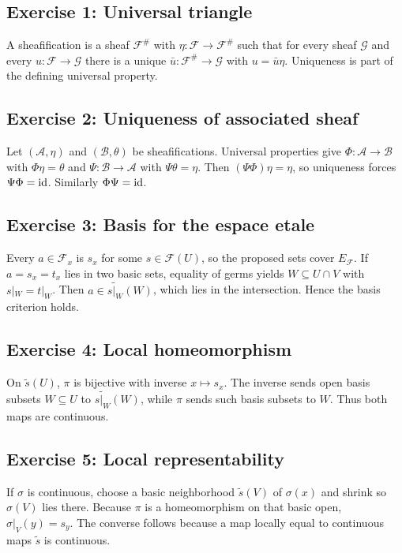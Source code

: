 \subsection*{Exercise 1: Universal triangle}
\begin{solution}
A sheafification is a sheaf $\mathcal F^\#$ with $\eta:\mathcal F\to\mathcal F^\#$ such that for every sheaf $\mathcal G$ and every $u:\mathcal F\to\mathcal G$ there is a unique $\bar u:\mathcal F^\#\to\mathcal G$ with $u=\bar u\eta$.  Uniqueness is part of the defining universal property.
\end{solution}

\subsection*{Exercise 2: Uniqueness of associated sheaf}
\begin{solution}
Let $(\mathcal A,\eta)$ and $(\mathcal B,\theta)$ be sheafifications.  Universal properties give $\Phi:\mathcal A\to\mathcal B$ with $\Phi\eta=\theta$ and $\Psi:\mathcal B\to\mathcal A$ with $\Psi\theta=\eta$.  Then $(\Psi\Phi)\eta=\eta$, so uniqueness forces $\Psi\Phi=\operatorname{id}$.  Similarly $\Phi\Psi=\operatorname{id}$.
\end{solution}

\subsection*{Exercise 3: Basis for the espace etale}
\begin{solution}
Every $a\in\mathcal F_x$ is $s_x$ for some $s\in\mathcal F(U)$, so the proposed sets cover $E_{\mathcal F}$.  If $a=s_x=t_x$ lies in two basic sets, equality of germs yields $W\subseteq U\cap V$ with $s|_W=t|_W$.  Then $a\in\widetilde{s|_W}(W)$, which lies in the intersection.  Hence the basis criterion holds.
\end{solution}

\subsection*{Exercise 4: Local homeomorphism}
\begin{solution}
On $\widetilde s(U)$, $\pi$ is bijective with inverse $x\mapsto s_x$.  The inverse sends open basis subsets $W\subseteq U$ to $\widetilde{s|_W}(W)$, while $\pi$ sends such basis subsets to $W$.  Thus both maps are continuous.
\end{solution}

\subsection*{Exercise 5: Local representability}
\begin{solution}
If $\sigma$ is continuous, choose a basic neighborhood $\widetilde s(V)$ of $\sigma(x)$ and shrink so $\sigma(V)$ lies there.  Because $\pi$ is a homeomorphism on that basic open, $\sigma|_V(y)=s_y$.  The converse follows because a map locally equal to continuous maps $\widetilde s$ is continuous.
\end{solution}

